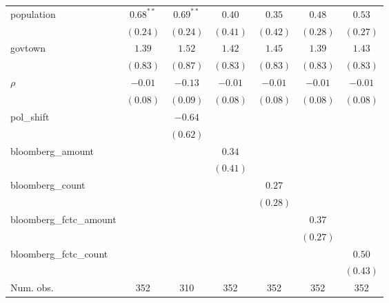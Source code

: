 \begin{table}[!h]
\begin{center}
\begin{tabular}{l c c c c c c }
population              & $0.68^{**}$  & $0.69^{**}$  & $0.40$       & $0.35$       & $0.48$       & $0.53$       \\
                        & $(0.24)$     & $(0.24)$     & $(0.41)$     & $(0.42)$     & $(0.28)$     & $(0.27)$     \\
govtown                 & $1.39$       & $1.52$       & $1.42$       & $1.45$       & $1.39$       & $1.43$       \\
                        & $(0.83)$     & $(0.87)$     & $(0.83)$     & $(0.83)$     & $(0.83)$     & $(0.83)$     \\
$\rho$                  & $-0.01$      & $-0.13$      & $-0.01$      & $-0.01$      & $-0.01$      & $-0.01$      \\
                        & $(0.08)$     & $(0.09)$     & $(0.08)$     & $(0.08)$     & $(0.08)$     & $(0.08)$     \\
pol\_shift              &              & $-0.64$      &              &              &              &              \\
                        &              & $(0.62)$     &              &              &              &              \\
bloomberg\_amount       &              &              & $0.34$       &              &              &              \\
                        &              &              & $(0.41)$     &              &              &              \\
bloomberg\_count        &              &              &              & $0.27$       &              &              \\
                        &              &              &              & $(0.28)$     &              &              \\
bloomberg\_fctc\_amount &              &              &              &              & $0.37$       &              \\
                        &              &              &              &              & $(0.27)$     &              \\
bloomberg\_fctc\_count  &              &              &              &              &              & $0.50$       \\
                        &              &              &              &              &              & $(0.43)$     \\
\midrule
Num. obs.               & 352          & 310          & 352          & 352          & 352          & 352          \\

\end{tabular}
\end{center}
\end{table}
